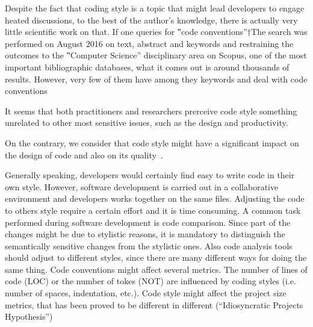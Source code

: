 Despite the fact that coding style is a topic that might lead developers to
engage heated discussions, to the best of the author's knowledge, there is
actually very little scientific work on that.  If one queries for ‟code
conventions”†{The search was performed on August 2016 on text, abstract and
keywords and restraining the outcomes to the ‟Computer Science” disciplinary
area} on Scopus, one of the most important
bibliographic databases, what it comes out is around thousands of results.
However, very few of them have  among they keywords and
deal with code conventions

It seems that both practitioners and researchers prerceive code style something unrelated to other most 
sensitive issues, such as the design and productivity.

On the contrary, we consider that code style might have a significant impact on the
design of code and also on its quality~\cite{Gil:2011}.

Generally speaking, developers would certainly find easy to write code in their own style. 
However, software development is carried out in a collaborative environment and developers 
works together on the same files. Adjusting the code to others style require a certain effort 
and it is time consuming. A common task performed during software development is code comparison.
Since part of the changes might be due to stylistic reasons, it is mandatory to distinguish the
semantically sensitive changes from the stylistic ones.
Also code analysis tools should adjust to different styles, since there are many
different ways for doing the same thing.
Code conventions might affect several metrics. The number of lines of code (LOC) or the number of
tokes (NOT) are influenced by coding styles (i.e. number of spaces, indentation, etc.). 
Code style might affect the project size metrics, that has been proved to be different in different
(``Idiosyncratic Projects Hypothesis'')~\cite{Gil:Lalouche:16}~\cite{Gil:2011:Goldstein:Moshkovich:2011} 

